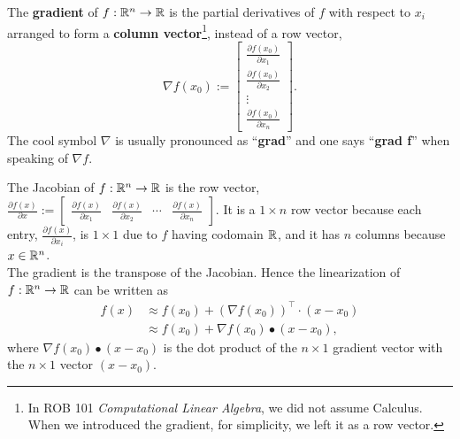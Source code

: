  \begin{tcolorbox}[colback=mylightblue, title=\textbf{The Gradient}, breakable]

 \begin{definition} 
\label{def:Gradient}
The \textbf{gradient} of $f:\mathbb R^{n} \to \mathbb R$ is the partial derivatives of $f$ with respect to $x_i$ arranged to form a \textbf{column vector}\footnote{In ROB 101 \textit{Computational Linear Algebra}, we did not assume Calculus. When we introduced the gradient, for simplicity, we left it as a row vector.}, instead of a row vector,
\begin{equation}
    \label{eq:GradientDef}
    \nabla f(x_0):=\left[\begin{array}{c}
        \frac{\partial f(x_0)}{\partial x_1} \\  \frac{\partial f(x_0)}{\partial x_2} \\ \vdots \\ \frac{\partial f(x_0)}{\partial x_n} 
    \end{array} \right].
\end{equation} 
The cool symbol $\nabla$ is usually pronounced as ``\textbf{grad}'' and one says ``\textbf{grad f}'' when speaking of $\nabla f$. 
\end{definition}

\begin{rem}
\label{rem:GradAndLinearization}
The Jacobian of $f:\mathbb R^{n} \to \mathbb R$ is the row vector, 
$\frac{\partial f(x)}{\partial x} := \left[\begin{array}{cccc}
      \frac{\partial f(x)}{\partial x_1} & \frac{\partial f(x)}{\partial x_2} & \cdots & \frac{\partial f(x)}{\partial x_n}
    \end{array} \right] $. It is a $1 \times n$ row vector because each entry, $\frac{\partial f(x)}{\partial x_i}$, is $1 \times 1$ due to $f$ having codomain $\mathbb R$, and it has $n$ columns because $x \in \mathbb R^{n}$.\\

The gradient is the transpose of the Jacobian. Hence the linearization of $f:\mathbb R^{n} \to \mathbb R$ can be written as
\begin{equation}
    \label{eq:GradLinearization}
    \begin{aligned}
           f(x) &\approx f(x_0) + \left(\nabla f(x_0) \right)^\top \cdot (x - x_0) \\
           & \approx f(x_0) + \nabla f(x_0) \bullet (x - x_0),
    \end{aligned}
\end{equation}
where $\nabla f(x_0) \bullet (x - x_0)$ is the dot product of the $n \times 1$ gradient vector with the $n \times 1$ vector $(x-x_0)$.  
\end{rem}
\end{tcolorbox}
    


